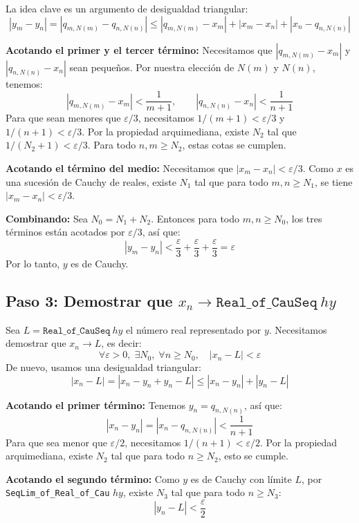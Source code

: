 La idea clave es un argumento de desigualdad triangular:
\[
  |y_m - y_n| = |q_{m,N(m)} - q_{n,N(n)}|
  \leq |q_{m,N(m)} - x_m| + |x_m - x_n| + |x_n - q_{n,N(n)}|
\]

\textbf{Acotando el primer y el tercer término:} Necesitamos que
$|q_{m,N(m)} - x_m|$ y $|q_{n,N(n)} - x_n|$ sean pequeños. Por nuestra elección de
$N(m)$ y $N(n)$, tenemos:
\[
  |q_{m,N(m)} - x_m| < \frac{1}{m+1}, \qquad
  |q_{n,N(n)} - x_n| < \frac{1}{n+1}
\]
Para que sean menores que $\varepsilon/3$, necesitamos $1/(m+1) < \varepsilon/3$ y
$1/(n+1) < \varepsilon/3$. Por la propiedad arquimediana, existe $N_2$ tal que
$1/(N_2+1) < \varepsilon/3$. Para todo $n, m \geq N_2$, estas cotas se cumplen.

\textbf{Acotando el término del medio:} Necesitamos que $|x_m - x_n| < \varepsilon/3$.
Como $x$ es una sucesión de Cauchy de reales, existe $N_1$ tal que para todo
$m, n \geq N_1$, se tiene $|x_m - x_n| < \varepsilon/3$.

\textbf{Combinando:} Sea $N_0 = N_1 + N_2$. Entonces para todo $m, n \geq N_0$, los
tres términos están acotados por $\varepsilon/3$, así que:
\[
  |y_m - y_n| < \frac{\varepsilon}{3} + \frac{\varepsilon}{3} + \frac{\varepsilon}{3} = \varepsilon
\]
Por lo tanto, $y$ es de Cauchy.

\subsection{Paso 3: Demostrar que $x_n \to \texttt{Real\_of\_CauSeq}\ \mathit{hy}$}

Sea $L = \texttt{Real\_of\_CauSeq}\ \mathit{hy}$ el número real representado por
$y$. Necesitamos demostrar que $x_n \to L$, es decir:
\[
  \forall \varepsilon > 0,\; \exists N_0,\; \forall n \geq N_0,\quad |x_n - L| < \varepsilon
\]
De nuevo, usamos una desigualdad triangular:
\[
  |x_n - L| = |x_n - y_n + y_n - L| \leq |x_n - y_n| + |y_n - L|
\]

\textbf{Acotando el primer término:} Tenemos $y_n = q_{n,N(n)}$, así que:
\[
  |x_n - y_n| = |x_n - q_{n,N(n)}| < \frac{1}{n+1}
\]
Para que sea menor que $\varepsilon/2$, necesitamos $1/(n+1) < \varepsilon/2$. Por
la propiedad arquimediana, existe $N_2$ tal que para todo $n \geq N_2$, esto se
cumple.

\textbf{Acotando el segundo término:} Como $y$ es de Cauchy con límite $L$, por
\texttt{SeqLim\_of\_Real\_of\_Cau} $\mathit{hy}$, existe $N_3$ tal que para todo
$n \geq N_3$:
\[
  |y_n - L| < \frac{\varepsilon}{2}
\]

